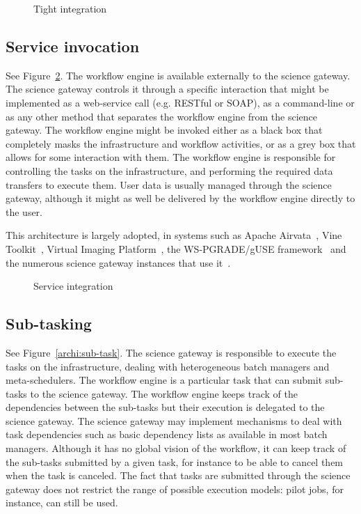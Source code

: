 \documentclass[preprint,3p,twocolumn]{elsarticle}
\begin{document}
\begin{figure}
\centering
\def\svgwidth{0.5\columnwidth}

\caption{Tight integration}
\label{archi:tight}
\end{figure}

\subsection{Service invocation}

See Figure~\ref{archi:service}. The workflow engine is available
externally to the science gateway. The science gateway controls it
through a specific interaction that might be implemented as a
web-service call (e.g. RESTful or SOAP), as a command-line or as any
other method that separates the workflow engine from the science
gateway. The workflow engine might be invoked either as a black box
that completely masks the infrastructure and workflow activities, or
as a grey box that allows for some interaction with them.  The
workflow engine is responsible for controlling the tasks on the
infrastructure, and performing the required data transfers to execute
them. User data is usually managed through the science gateway,
although it might as well be delivered by the workflow engine directly
to the user.

This architecture is largely adopted, in systems such as Apache
Airvata~\cite{marru2011apache}, Vine
Toolkit~\cite{DBLP:journals/scpe/SzejnfeldDKKKKLPTWDNW10}, Virtual
Imaging Platform~\cite{GLAT-13}, the WS-PGRADE/gUSE
framework~\cite{Kacsuk2012} and the numerous science gateway instances
that use it~\cite{kacsuk2014science}.
\begin{figure}
\centering
\def\svgwidth{0.5\columnwidth}

\caption{Service integration}
\label{archi:service}
\end{figure}

\subsection{Sub-tasking}

See Figure~\ref{archi:sub-task}. The science gateway is responsible to
execute the tasks on the infrastructure, dealing with heterogeneous
batch managers and meta-schedulers. The workflow engine is a
particular task that can submit sub-tasks to the science gateway. The
workflow engine keeps track of the dependencies between the sub-tasks
but their execution is delegated to the science gateway. The science
gateway may implement mechanisms to deal with task dependencies such
as basic dependency lists as available in most batch
managers. Although it has no global vision of the workflow, it can
keep track of the sub-tasks submitted by a given task, for instance to
be able to cancel them when the task is canceled. The fact that tasks
are submitted through the science gateway does not restrict the range
of possible execution models: pilot jobs, for instance, can still be
used.
\end{document}
